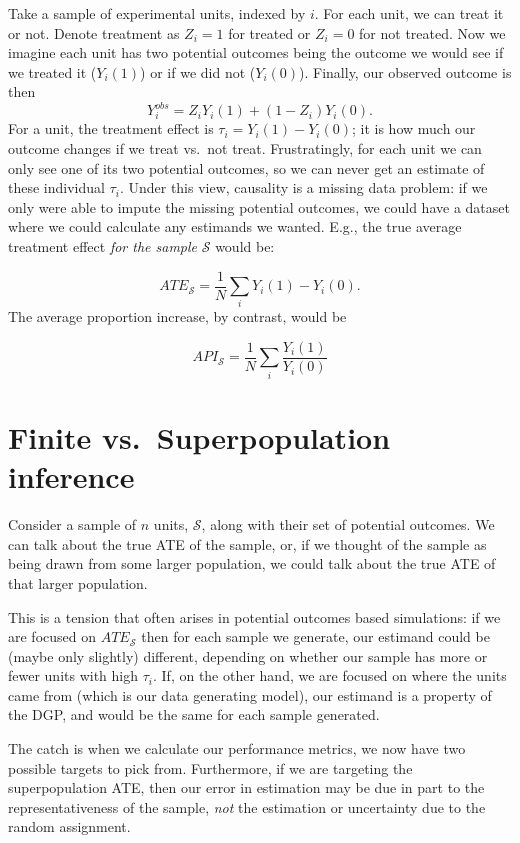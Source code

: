 \documentclass[
]{book}
\begin{document}
Take a sample of experimental units, indexed by \(i\).
For each unit, we can treat it or not.
Denote treatment as \(Z_i = 1\) for treated or \(Z_i = 0\) for not treated.
Now we imagine each unit has two potential outcomes being the outcome we would see if we treated it (\(Y_i(1)\)) or if we did not (\(Y_i(0)\)).
Finally, our observed outcome is then
\[ Y_i^{obs} = Z_i Y_i(1) + (1-Z_i)Y_i(0) .\]
For a unit, the treatment effect is \(\tau_i = Y_i(1) - Y_i(0)\); it is how much our outcome changes if we treat vs.~not treat.
Frustratingly, for each unit we can only see one of its two potential outcomes, so we can never get an estimate of these individual \(\tau_i\).
Under this view, causality is a missing data problem: if we only were able to impute the missing potential outcomes, we could have a dataset where we could calculate any estimands we wanted. E.g., the true average treatment effect \emph{for the sample} \(\mathcal{S}\) would be:

\[ ATE_{\mathcal{S}} = \frac{1}{N} \sum_{i} Y_i(1) - Y_i( 0 ) . \]
The average proportion increase, by contrast, would be

\[ API_{\mathcal{S}} = \frac{1}{N} \sum_{i} \frac{Y_i(1)}{Y_i(0)} \]

\hypertarget{finite-vs.-superpopulation-inference}{%
\section{Finite vs.~Superpopulation inference}\label{finite-vs.-superpopulation-inference}}

Consider a sample of \(n\) units, \(\mathcal{S}\), along with their set of potential outcomes.
We can talk about the true ATE of the sample, or, if we thought of the sample as being drawn from some larger population, we could talk about the true ATE of that larger population.

This is a tension that often arises in potential outcomes based simulations: if we are focused on \(ATE_{\mathcal{S}}\) then for each sample we generate, our estimand could be (maybe only slightly) different, depending on whether our sample has more or fewer units with high \(\tau_i\).
If, on the other hand, we are focused on where the units came from (which is our data generating model), our estimand is a property of the DGP, and would be the same for each sample generated.

The catch is when we calculate our performance metrics, we now have two possible targets to pick from.
Furthermore, if we are targeting the superpopulation ATE, then our error in estimation may be due in part to the representativeness of the sample, \emph{not} the estimation or uncertainty due to the random assignment.
\end{document}

